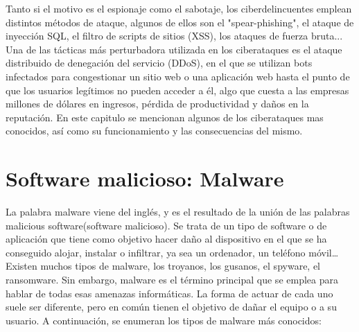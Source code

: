 Tanto si el motivo es el espionaje como el sabotaje, los ciberdelincuentes emplean distintos métodos de ataque, algunos de ellos son el "spear-phishing",
 el ataque de inyección SQL, el filtro de scripts de sitios (XSS), los ataques de fuerza bruta... Una de las tácticas más perturbadora utilizada en los ciberataques 
es el ataque distribuido de denegación del servicio (DDoS), en el que se utilizan bots infectados para congestionar un sitio web o una aplicación web hasta el punto 
de que los usuarios legítimos no pueden acceder a él, algo que cuesta a las empresas millones de dólares en ingresos, pérdida de productividad y daños en la reputación.\nocite{akamai}
En este capitulo se mencionan algunos de los ciberataques mas conocidos, así como su funcionamiento y las consecuencias del mismo.

\section{Software malicioso: Malware}
\label{sec:malware}

La palabra malware viene del inglés, y es el resultado de la unión de las palabras malicious software(software malicioso). Se trata de un tipo de software o de aplicación que tiene como objetivo hacer daño al dispositivo en el que se ha conseguido alojar, instalar o infiltrar, ya sea un ordenador, un teléfono móvil… 
Existen muchos tipos de malware, los troyanos, los gusanos, el spyware, el ransomware. Sin embargo, malware es el término principal que se emplea para hablar de todas esas amenazas informáticas. La forma de actuar de cada uno suele ser diferente, pero en común tienen el objetivo de dañar el equipo o a su usuario. A continuación, se enumeran los tipos de malware más conocidos:

